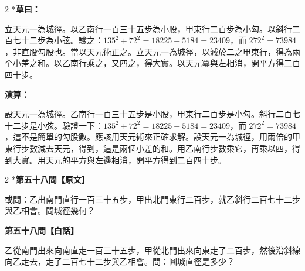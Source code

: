 \documentclass[11pt,a4paper]{article}
\newcommand{\tianyuan}[2]{\raisebox{-0.6ex}{\scriptsize$\begin{array}{c}#1\\\hline #2\end{array}$}}
\begin{document}
\begin{paracol}{2}
\switchcolumn[0]*\textbf{草曰：}

\small 立天元一為城徑。以乙南行一百三十五步為小股，甲東行二百步為小勾。以斜行二百七十二步為小弦。驗之：$135^2 + 72^2 = 18225 + 5184 = 23409$，而 $272^2 = 73984$，非直股勾股也。當以天元術正之。立天元一為城徑，以減於二之甲東行，得\tianyuan{400}{1}為兩个小差之和。以乙南行乘之，又四之，得大實。以天元冪與左相消，開平方得二百四十步。

\switchcolumn\textbf{演算：}

\small 設天元一為城徑。乙南行一百三十五步是小股，甲東行二百步是小勾。斜行二百七十二步是小弦。驗證一下：$135^2 + 72^2 = 18225 + 5184 = 23409$，而 $272^2 = 73984$，這不是簡單的勾股數。應該用天元術來正確求解。設天元一為城徑，用兩倍的甲東行步數減去天元，得到\tianyuan{400}{1}，這是兩個小差的和。用乙南行步數乘它，再乘以四，得到大實。用天元的平方與左邊相消，開平方得到二百四十步。
\end{paracol}

\vspace{0.1cm}
\noindent{}
\par\vspace{0.3cm}

\begin{paracol}{2}
\switchcolumn[0]*\noindent\textbf{第五十八問【原文】}

\small 或問：乙出南門直行一百三十五步，甲出北門東行二百步，就乙斜行二百七十二步與乙相會。問城徑幾何？

\switchcolumn\noindent\textbf{第五十八問【白話】}

\small 乙從南門出來向南直走一百三十五步，甲從北門出來向東走了二百步，然後沿斜線向乙走去，走了二百七十二步與乙相會。問：圓城直徑是多少？
\end{paracol}

\vspace{0.1cm}
\noindent{}
\par\vspace{0.15cm}
\end{document}
